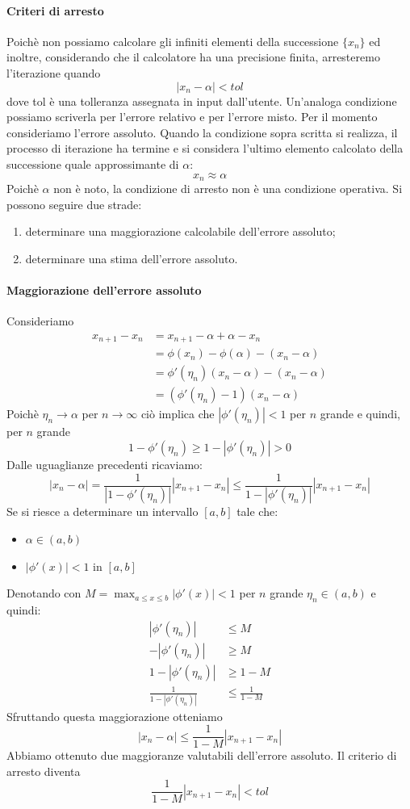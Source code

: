 \documentclass[12pt]{report}
\begin{document}
\paragraph{Criteri di arresto}
Poichè non possiamo calcolare gli infiniti elementi della successione $\{x_n\}$ ed inoltre, considerando che il calcolatore ha una precisione finita, arresteremo l'iterazione quando
\[
|x_n - \alpha| < tol
\]
dove tol è una tolleranza assegnata in input dall'utente. Un'analoga condizione possiamo scriverla per l'errore relativo e per l'errore misto. Per il momento consideriamo l'errore assoluto. Quando la condizione sopra scritta si realizza, il processo di iterazione ha termine e si considera l'ultimo elemento calcolato della successione quale approssimante di $\alpha$:
\[
x_n \approx \alpha
\]
Poichè $\alpha$ non è noto, la condizione di arresto non è una condizione operativa. Si possono seguire due strade:
\begin{enumerate}
	\item determinare una maggiorazione calcolabile dell'errore assoluto;
	\item determinare una stima dell'errore assoluto.
\end{enumerate}
\paragraph{Maggiorazione dell'errore assoluto} Consideriamo
\begin{align*}
x_{n+1} - x_n &= x_{n+1} - \alpha + \alpha - x_n \\
&= \phi(x_n) - \phi(\alpha) - (x_n - \alpha) \\
&= \phi'(\eta_n)(x_n - \alpha) - (x_n - \alpha) \\
&= (\phi'(\eta_n) - 1)(x_n - \alpha)
\end{align*}
Poichè $\eta_n \to \alpha$ per $n \to \infty$ ciò implica che $|\phi'(\eta_n)| < 1$ per $n$ grande e quindi, per $n$ grande
\[
1 - \phi'(\eta_n) \geq 1 - |\phi'(\eta_n)| > 0
\]
Dalle uguaglianze precedenti ricaviamo:
\[
|x_n - \alpha| = \frac{1}{|1-\phi'(\eta_n)|}|x_{n+1} - x_n| \leq \frac{1}{1-|\phi'(\eta_n)|}|x_{n+1} - x_n|
\]
Se si riesce a determinare un intervallo $[a, b]$ tale che:
\begin{itemize}
	\item $\alpha \in (a, b)$
	\item $|\phi'(x)| < 1$ in $[a, b]$
\end{itemize}
Denotando con $M = \max_{a \leq x \leq b}|\phi'(x)| < 1$ per $n$ grande $\eta_n \in (a, b)$ e quindi:
\begin{align*}
	|\phi'(\eta_n)| &\leq M \\
	-|\phi'(\eta_n)| &\geq M \\
	1 - |\phi'(\eta_n)| &\geq 1 - M \\
	\frac{1}{1- |\phi'(\eta_n)|} &\leq \frac{1}{1- M}
\end{align*}
Sfruttando questa maggiorazione otteniamo
\[
|x_n - \alpha| \leq \frac{1}{1-M} |x_{n+1}-x_n|
\]
Abbiamo ottenuto due maggioranze valutabili dell'errore assoluto. Il criterio di arresto diventa
\[
\frac{1}{1-M}|x_{n+1} - x_n| < tol
\]
\end{document}
